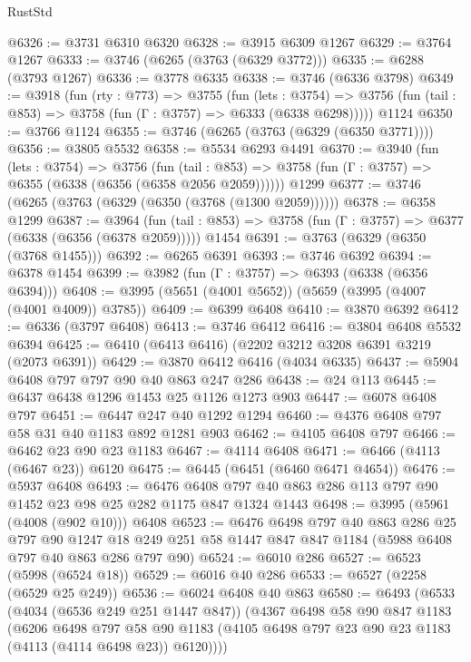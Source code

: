 \begin{lexlean}{RustStd}
\begin{coremodule}
@6326 := @3731 @6310 @6320
@6328 := @3915 @6309 @1267
@6329 := @3764 @1267
@6333 := @3746 (@6265 (@3763 (@6329 @3772)))
@6335 := @6288 (@3793 @1267)
@6336 := @3778 @6335
@6338 := @3746 (@6336 @3798)
@6349 := @3918
    (fun (rty : @773) =>
    @3755
      (fun (lets : @3754) =>
      @3756 (fun (tail : @853) => @3758 (fun (Γ : @3757) => @6333 (@6338 @6298)))))
    @1124
@6350 := @3766 @1124
@6355 := @3746 (@6265 (@3763 (@6329 (@6350 @3771))))
@6356 := @3805 @5532
@6358 := @5534 @6293 @4491
@6370 := @3940
    (fun (lets : @3754) =>
    @3756
      (fun (tail : @853) => @3758 (fun (Γ : @3757) => @6355 (@6338 (@6356 (@6358 @2056 @2059))))))
    @1299
@6377 := @3746 (@6265 (@3763 (@6329 (@6350 (@3768 (@1300 @2059))))))
@6378 := @6358 @1299
@6387 := @3964
    (fun (tail : @853) => @3758 (fun (Γ : @3757) => @6377 (@6338 (@6356 (@6378 @2059)))))
    @1454
@6391 := @3763 (@6329 (@6350 (@3768 @1455)))
@6392 := @6265 @6391
@6393 := @3746 @6392
@6394 := @6378 @1454
@6399 := @3982 (fun (Γ : @3757) => @6393 (@6338 (@6356 @6394)))
@6408 := @3995 (@5651 (@4001 @5652)) (@5659 (@3995 (@4007 (@4001 @4009)) @3785))
@6409 := @6399 @6408
@6410 := @3870 @6392
@6412 := @6336 (@3797 @6408)
@6413 := @3746 @6412
@6416 := @3804 @6408 @5532 @6394
@6425 := @6410 (@6413 @6416) (@2202 @3212 @3208 @6391 @3219 (@2073 @6391))
@6429 := @3870 @6412 @6416 (@4034 @6335)
@6437 := @5904 @6408 @797 @797 @90 @40 @863 @247 @286
@6438 := @24 @113
@6445 := @6437 @6438 @1296 @1453 @25 @1126 @1273 @903
@6447 := @6078 @6408 @797
@6451 := @6447 @247 @40 @1292 @1294
@6460 := @4376 @6408 @797 @58 @31 @40 @1183 @892 @1281 @903
@6462 := @4105 @6408 @797
@6466 := @6462 @23 @90 @23 @1183
@6467 := @4114 @6408
@6471 := @6466 (@4113 (@6467 @23)) @6120
@6475 := @6445 (@6451 (@6460 @6471 @4654))
@6476 := @5937 @6408
@6493 := @6476 @6408 @797 @40 @863 @286 @113 @797 @90 @1452 @23 @98 @25 @282 @1175 @847 @1324 @1443
@6498 := @3995 (@5961 (@4008 (@902 @10))) @6408
@6523 := @6476
    @6498
    @797
    @40
    @863
    @286
    @25
    @797
    @90
    @1247
    @18
    @249
    @251
    @58
    @1447
    @847
    @847
    @1184
    (@5988 @6408 @797 @40 @863 @286 @797 @90)
@6524 := @6010 @286
@6527 := @6523 (@5998 (@6524 @18))
@6529 := @6016 @40 @286
@6533 := @6527 (@2258 (@6529 @25 @249))
@6536 := @6024 @6408 @40 @863
@6580 := @6493
    (@6533
      (@4034 (@6536 @249 @251 @1447 @847))
      (@4367
        @6498
        @58
        @90
        @847
        @1183
        (@6206
          @6498
          @797
          @58
          @90
          @1183
          (@4105 @6498 @797 @23 @90 @23 @1183 (@4113 (@4114 @6498 @23)) @6120))))

\end{coremodule}
\end{lexlean}
